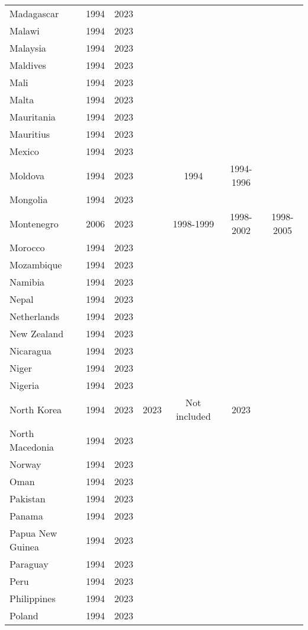 {\begin{longtable}{lcccccc}
Madagascar & 1994 & 2023 &  &  &  & \\
Malawi & 1994 & 2023 &  &  &  & \\
Malaysia & 1994 & 2023 &  &  &  & \\
Maldives & 1994 & 2023 &  &  &  & \\
\addlinespace
Mali & 1994 & 2023 &  &  &  & \\
Malta & 1994 & 2023 &  &  &  & \\
Mauritania & 1994 & 2023 &  &  &  & \\
Mauritius & 1994 & 2023 &  &  &  & \\
Mexico & 1994 & 2023 &  &  &  & \\
\addlinespace
Moldova & 1994 & 2023 &  & 1994 & 1994-1996 & \\
Mongolia & 1994 & 2023 &  &  &  & \\
Montenegro & 2006 & 2023 &  & 1998-1999 & 1998-2002 & 1998-2005\\
Morocco & 1994 & 2023 &  &  &  & \\
Mozambique & 1994 & 2023 &  &  &  & \\
\addlinespace
Namibia & 1994 & 2023 &  &  &  & \\
Nepal & 1994 & 2023 &  &  &  & \\
Netherlands & 1994 & 2023 &  &  &  & \\
New Zealand & 1994 & 2023 &  &  &  & \\
Nicaragua & 1994 & 2023 &  &  &  & \\
\addlinespace
Niger & 1994 & 2023 &  &  &  & \\
Nigeria & 1994 & 2023 &  &  &  & \\
North Korea & 1994 & 2023 & 2023 & Not included & 2023 & \\
North Macedonia & 1994 & 2023 &  &  &  & \\
Norway & 1994 & 2023 &  &  &  & \\
\addlinespace
Oman & 1994 & 2023 &  &  &  & \\
Pakistan & 1994 & 2023 &  &  &  & \\
Panama & 1994 & 2023 &  &  &  & \\
Papua New Guinea & 1994 & 2023 &  &  &  & \\
Paraguay & 1994 & 2023 &  &  &  & \\
\addlinespace
Peru & 1994 & 2023 &  &  &  & \\
Philippines & 1994 & 2023 &  &  &  & \\
Poland & 1994 & 2023 &  &  &  & \\

\end{longtable}}
